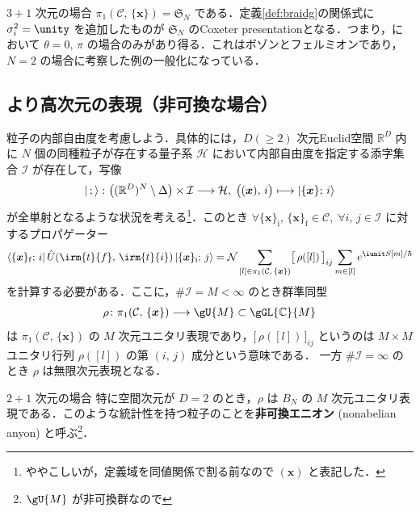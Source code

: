 \documentclass[TQFT_main]{subfiles}
\begin{document}
\begin{myexample}[label=ex:1-2abelian]{$3+1$ 次元の場合}
    $\pi_1(\mathcal{C},\, \{\bm{x}\}) = \mathfrak{S}_N$ である．定義\ref{def:braidg}の関係式に $\sigma_i^2 = \unity$ を追加したものが $\mathfrak{S}_N$ のCoxeter presentationとなる．つまり，において $\theta = 0,\, \pi$ の場合のみがあり得る．これはボゾンとフェルミオンであり，$N=2$ の場合に考察した例の一般化になっている．
\end{myexample}

\subsection{より高次元の表現（非可換な場合）}

粒子の内部自由度を考慮しよう．具体的には，$D (\ge 2)$ 次元Euclid空間 $\mathbb{R}^D$ 内に $N$ 個の同種粒子が存在する量子系 $\mathcal{H}$ において内部自由度を指定する添字集合 $\mathcal{I}$ が存在して，写像
\begin{align}
    \ket{\, ;\, } \colon \bigl((\mathbb{R}^D)^N \setminus \Delta\bigr) \times \mathcal{I} \longrightarrow \mathcal{H},\; \bigl((\bm{x}),\, i\bigr) \longmapsto \ket{\{\bm{x}\};\, i}
\end{align}
が全単射となるような状況を考える\footnote{ややこしいが，定義域を同値関係で割る前なので $(\bm{x})$ と表記した．}．このとき $\forall \{\bm{x}\}_{\mathrm{i}},\, \{\bm{x}\}_{\mathrm{f}} \in \mathcal{C},\; \forall i,\, j \in \mathcal{I}$ に対するプロパゲーター
\begin{align}
    \bra{\{\bm{x}\}_{\mathrm{f}};\, i} \hat{U} (\irm{t}{f},\, \irm{t}{i}) \ket{\{\bm{x}\}_{\mathrm{i}};\, j} = \mathcal{N} \sum_{[l] \in \pi_1(\mathcal{C},\, \{\bm{x}\})} \bigl[\, \rho([l])\, \bigr]_{ij} \sum_{m \in [l]} e^{\iunit S[m]/\hbar}
\end{align}
を計算する必要がある．ここに，$\# \mathcal{I} = M < \infty$ のとき群準同型
\begin{align}
    \rho \colon \pi_1 (\mathcal{C},\, \{\bm{x}\}) \lto \gU{M} \subset \gGL{\mathbb{C}}{M}
\end{align}
は $\pi_1 (\mathcal{C},\, \{\bm{x}\})$ の $M$ 次元ユニタリ表現であり，$\bigl[\, \rho([l])\, \bigr]_{ij}$ というのは $M \times M$ ユニタリ行列 $\rho([l])$ の第 $(i,\, j)$ 成分という意味である．
一方 $\# \mathcal{I} = \infty$ のとき $\rho$ は無限次元表現となる．

\begin{myexample}[label=ex:1-3nonabelian]{$2+1$ 次元の場合}
    特に空間次元が $D=2$ のとき，$\rho$ は $B_N$ の $M$ 次元ユニタリ表現である．このような統計性を持つ粒子のことを\textbf{非可換エニオン} (nonabelian anyon) と呼ぶ\footnote{$\gU{M}$ が非可換群なので}．
\end{myexample}
\end{document}
